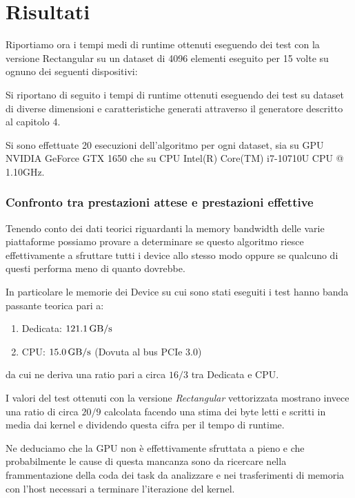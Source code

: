 \chapter{Risultati}
\vspace{4cm}

Riportiamo ora i tempi medi di runtime ottenuti eseguendo dei test con la
versione Rectangular su un dataset di 4096 elementi eseguito per 15 volte su
ognuno dei seguenti dispositivi:

Si riportano di seguito i tempi di runtime ottenuti eseguendo dei test su dataset di diverse dimensioni e caratteristiche generati attraverso il generatore descritto al capitolo 4.

Si sono effettuate 20 esecuzioni dell'algoritmo per ogni dataset, sia su GPU NVIDIA GeForce GTX 1650 che su CPU Intel(R) Core(TM) i7-10710U CPU @ 1.10GHz.



\subsection{Confronto tra prestazioni attese e prestazioni effettive}
Tenendo conto dei dati teorici riguardanti la memory bandwidth delle varie piattaforme possiamo provare a determinare se questo algoritmo riesce effettivamente a sfruttare tutti i device allo stesso modo oppure se qualcuno di questi performa meno di quanto dovrebbe.

In particolare le memorie dei Device su cui sono stati eseguiti i test hanno banda passante teorica pari a:
\begin{enumerate}
	\item Dedicata: $\SI{121.1}{\giga\byte/\second}$
	\item CPU: $\SI{15.0}{\giga\byte/\second}$ (Dovuta al bus PCIe 3.0)
\end{enumerate}
da cui ne deriva una ratio pari a circa $16/3$ tra Dedicata e CPU.

I valori del test ottenuti con la versione \textit{Rectangular} vettorizzata mostrano invece una ratio di circa $20/9$ calcolata facendo una stima dei byte letti e scritti in media dai kernel e dividendo questa cifra per il tempo di runtime.

Ne deduciamo che la GPU non è effettivamente sfruttata a pieno e che probabilmente le cause di questa mancanza sono da ricercare nella frammentazione della coda dei task da analizzare e nei trasferimenti di memoria con l'host necessari a terminare l'iterazione del kernel.

